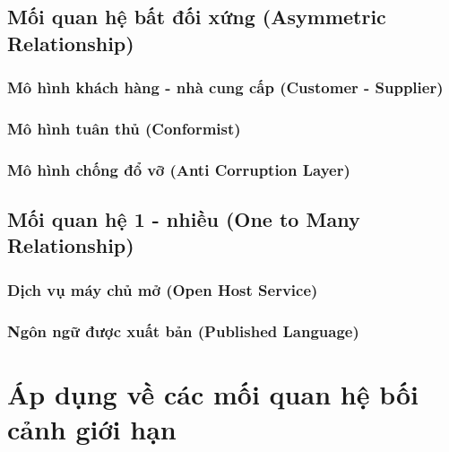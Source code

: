 \documentclass{report} %
\begin{document}
% 

\subsection{Mối quan hệ bất đối xứng (Asymmetric Relationship)}



% 

\subsubsection{Mô hình khách hàng - nhà cung cấp (Customer - Supplier)}

% 

\subsubsection{Mô hình tuân thủ (Conformist)}

% 

\subsubsection{Mô hình chống đổ vỡ (Anti Corruption Layer)}

% 

\subsection{Mối quan hệ 1 - nhiều (One to Many Relationship)}

% 

\subsubsection{Dịch vụ máy chủ mở (Open Host Service)}

% 

\subsubsection{Ngôn ngữ được xuất bản (Published Language)}

% 


\section{Áp dụng về các mối quan hệ bối cảnh giới hạn}

\end{document}
